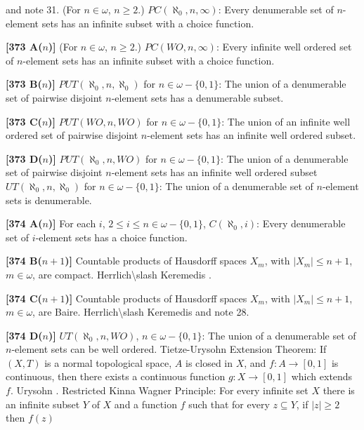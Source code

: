 and note 31. 
\medskip
{} (For $n\in\omega$, $n\ge 2$.)
$PC(\aleph_0,n,\infty)$: Every denumerable set of $n$-element sets has
an infinite subset with a choice function.
\smallskip
\item{}{\bf [373 A($n$)]} (For $n\in\omega$, $n\ge 2$.)
$PC(WO,n,\infty)$: Every infinite well ordered set of $n$-element sets
has an infinite subset with a choice function.
\smallskip
\item{}{\bf [373 B($n$)]} $PUT(\aleph_0,n,\aleph_0)$ for
$n\in\omega-\{0,1\}$: The union of a denumerable set of pairwise
disjoint $n$-element sets has a denumerable subset.
\smallskip
\item{}{\bf [373 C($n$)]} $PUT(WO,n,WO)$ for $n\in\omega -\{0,1\}$: The
union of an infinite well ordered set of pairwise disjoint $n$-element
sets has an infinite well ordered subset.
\smallskip
\item{}{\bf [373 D($n$)]} $PUT(\aleph_0,n,WO)$ for $n\in\omega
-\{0,1\}$: The union of a denumerable set of pairwise disjoint $n$-element sets has an
infinite well ordered subset
\medskip
{} $UT(\aleph_0,n,\aleph_0)$ for $n\in\omega
-\{0,1\}$: The union of a denumerable set of $n$-element sets is
denumerable.
\smallskip
\item{}{\bf [374 A($n$)]} For each $i$, $2\le i\le n\in\omega-\{0,1\}$,
$C(\aleph_0,i)$: Every denumerable set of $i$-element sets has a choice
function.
\smallskip
\item{}{\bf [374 B($n+1$)]} Countable products of Hausdorff spaces $X_m$,
with $|X_m|\leq n+1$, $m\in\omega$, are compact. \ac{Herrlich\slash
Keremedis} \cite{1999b}.
\smallskip
\item{}{\bf [374 C($n+1$)]} Countable products of Hausdorff spaces $X_m$,
with $|X_m|\leq n+1$, $m\in\omega$, are Baire. \ac{Herrlich\slash Keremedis}
\cite{1999b} and note 28.
\smallskip
\item{}{\bf [374 D($n$)]} $UT(\aleph_0,n,WO)$, $n\in\omega-\{0,1\}$:
The union of a denumerable set of $n$-element sets can be well ordered.
\medskip
{} Tietze-Urysohn Extension Theorem: If
$(X,T)$ is a normal topological space, $A$ is closed in $X$, and
$f: A\to [0,1]$ is continuous, then there exists a continuous
function $g: X\to [0,1]$ which extends $f$. \ac{Urysohn} \cite{1924}.
\medskip
{} Restricted Kinna Wagner Principle:  For every
infinite set $X$ there is an infinite subset $Y$ of $X$ and a function
$f$ such that for every $z\subseteq Y$, if $|z| \ge 2$ then $f(z)$
